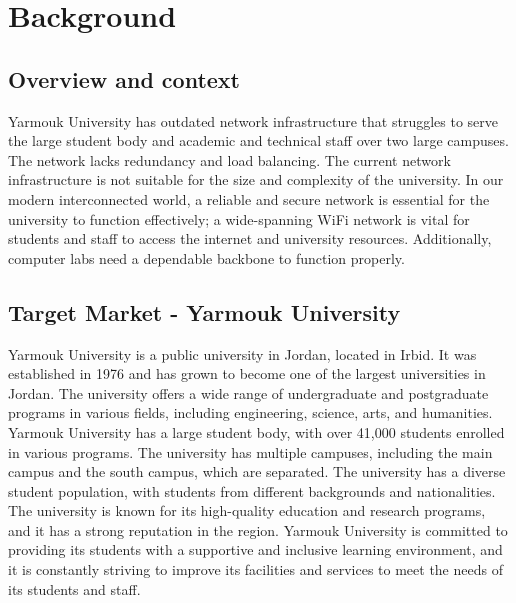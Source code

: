 \documentclass[12pt]{report}
\begin{document}

\chapter{Background}
\section{Overview and context}

Yarmouk University has outdated network infrastructure that struggles to serve the large student body and academic and technical staff over two large campuses. The network lacks redundancy and load balancing. The current network infrastructure is not suitable for the size and complexity of the university. In our modern interconnected world, a reliable and secure network is essential for the university to function effectively; a wide-spanning WiFi network is vital for students and staff to access the internet and university resources. Additionally, computer labs need a dependable backbone to function properly.

\section{Target Market - Yarmouk University}
Yarmouk University is a public university in Jordan, located in Irbid. It was established in 1976 and has grown to become one of the largest universities in Jordan. The university offers a wide range of undergraduate and postgraduate programs in various fields, including engineering, science, arts, and humanities. Yarmouk University has a large student body, with over 41,000 students enrolled in various programs. The university has multiple campuses, including the main campus and the south campus, which are separated. The university has a diverse student population, with students from different backgrounds and nationalities. The university is known for its high-quality education and research programs, and it has a strong reputation in the region. Yarmouk University is committed to providing its students with a supportive and inclusive learning environment, and it is constantly striving to improve its facilities and services to meet the needs of its students and staff. \cite{YU}
\end{document}
